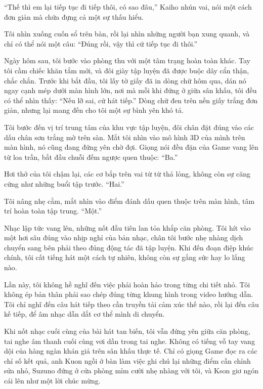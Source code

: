 ﻿\documentclass[../main.tex]{subfiles}
\begin{document}
``Thế thì em lại tiếp tục đi tiếp thôi, có sao đâu,'' Kaiho nhún vai, nói một cách đơn giản mà chứa đựng cả một sự thấu hiểu.

Tôi nhìn xuống cuốn sổ trên bàn, rồi lại nhìn những người bạn xung quanh, và chỉ có thể nói một câu: ``Đúng rồi, vậy thì cứ tiếp tục đi thôi.''

\ct

Ngày hôm sau, tôi bước vào phòng thu với một tâm trạng hoàn toàn khác. Tay tôi cầm chiếc khăn tắm mới, và đôi giày tập luyện đã được buộc dây cẩn thận, chắc chắn. Trước khi bắt đầu, tôi lấy tờ giấy đã in dòng chữ hôm qua, dán nó ngay cạnh mép dưới màn hình lớn, nơi mà mỗi khi đứng ở giữa sân khấu, tôi đều có thể nhìn thấy: ``Nếu lỡ sai, cứ hát tiếp.'' Dòng chữ đen trên nền giấy trắng đơn giản, nhưng lại mang đến cho tôi một sự bình yên khó tả.

Tôi bước đến vị trí trung tâm của khu vực tập luyện, đôi chân đặt đúng vào các dấu chân sơn trắng mờ trên sàn. Mắt tôi nhìn vào mô hình 3D của mình trên màn hình, nó cũng đang đứng yên chờ đợi. Giọng nói đều đặn của Game vang lên từ loa trần, bắt đầu chuỗi đếm ngược quen thuộc: ``Ba.''

Hơi thở của tôi chậm lại, các cơ bắp trên vai từ từ thả lỏng, không còn sự căng cứng như những buổi tập trước. ``Hai.''

Tôi nâng nhẹ cằm, mắt nhìn vào điểm đánh dấu quen thuộc trên màn hình, tâm trí hoàn toàn tập trung. ``Một.''

Nhạc lập tức vang lên, những nốt đầu tiên lan tỏa khắp căn phòng. Tôi hít vào một hơi sâu đúng vào nhịp nghỉ của bản nhạc, chân tôi bước nhẹ nhàng dịch chuyển sang bên phải theo đúng động tác đã tập luyện. Khi đến đoạn điệp khúc chính, tôi cất tiếng hát một cách tự nhiên, không còn sự gắng sức hay lo lắng nào.

Lần này, tôi không hề nghĩ đến việc phải hoàn hảo trong từng chi tiết nhỏ. Tôi không ép bản thân phải sao chép đúng từng khung hình trong video hướng dẫn. Tôi chỉ nghĩ đến câu hát tiếp theo cần truyền tải cảm xúc thế nào, rồi lại đến câu kế tiếp, để âm nhạc dẫn dắt cơ thể mình di chuyển.

Khi nốt nhạc cuối cùng của bài hát tan biến, tôi vẫn đứng yên giữa căn phòng, tai nghe âm thanh cuối cùng vơi dần trong tai nghe. Không có tiếng vỗ tay vang dội của hàng ngàn khán giả trên sân khấu thực tế. Chỉ có giọng Game đọc ra các chỉ số kết quả, anh Kuon ngồi ở bàn làm việc ghi chú lại những điểm cần chỉnh sửa nhỏ, Suzuno đứng ở cửa phòng mỉm cười nhẹ nhàng với tôi, và Kson giơ ngón cái lên như một lời chúc mừng.
\end{document}
